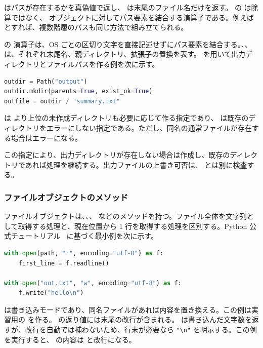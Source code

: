  はパスが存在するかを真偽値で返し、 は末尾のファイル名だけを返す。 の \code{/} は除算ではなく、 オブジェクトに対してパス要素を結合する演算子である。例えば  とすれば、複数階層のパスも同じ方法で組み立てられる。

 の \code{/} 演算子は、OS ごとの区切り文字を直接記述せずにパス要素を結合する。、、 は、それぞれ末尾名、親ディレクトリ、拡張子の置換を表す。 を用いて出力ディレクトリとファイルパスを作る例を次に示す。

\begin{lstlisting}[language=Python]
outdir = Path("output")
outdir.mkdir(parents=True, exist_ok=True)
outfile = outdir / "summary.txt"
\end{lstlisting}

 は  より上位の未作成ディレクトリも必要に応じて作る指定であり、 は既存のディレクトリをエラーにしない指定である。ただし、同名の通常ファイルが存在する場合はエラーになる。

この指定により、出力ディレクトリが存在しない場合は作成し、既存のディレクトリであれば処理を継続する。出力ファイルの上書き可否は、 とは別に検査する。

\subsubsection{ファイルオブジェクトのメソッド}

ファイルオブジェクトは、、、 などのメソッドを持つ。ファイル全体を文字列として取得する処理と、現在位置から 1 行を取得する処理を区別する。Python 公式チュートリアル~\cite{python_tutorial} に基づく最小例を次に示す。

\begin{lstlisting}[language=Python]
with open(path, "r", encoding="utf-8") as f:
    first_line = f.readline()

with open("out.txt", "w", encoding="utf-8") as f:
    f.write("hello\n")
\end{lstlisting}

 は書き込みモードであり、同名ファイルがあれば内容を置き換える。この例は実習用の  を作る。 の返り値には末尾の改行が含まれる。 は書き込んだ文字数を返すが、改行を自動では補わないため、行末が必要なら \verb|"\n"| を明示する。この例を実行すると、 の内容は  と改行になる。

